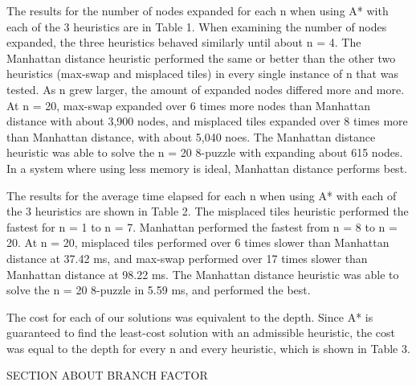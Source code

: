 \documentclass{article}
\begin{document}
		The results for the number of nodes expanded for each n when using A* with each of the 3 heuristics are in Table 1. When examining the number of nodes expanded, the three heuristics behaved similarly until about n = 4. The Manhattan distance heuristic performed the same or better than the other two heuristics (max-swap and misplaced tiles) in every single instance of n that was tested. As n grew larger, the amount of expanded nodes differed more and more. At n = 20, max-swap expanded over 6 times more nodes than Manhattan distance with about 3,900 nodes, and misplaced tiles expanded over 8 times more than Manhattan distance, with about 5,040 noes. The Manhattan distance heuristic was able to solve the n = 20 8-puzzle with expanding about 615 nodes. In a system where using less memory is ideal, Manhattan distance performs best. \par
			
	   The results for the average time elapsed for each n when using A* with each of the 3 heuristics are shown in Table 2. The misplaced tiles heuristic performed the fastest for n = 1 to n = 7. Manhattan performed the fastest from n = 8 to n = 20. At n = 20, misplaced tiles performed over 6 times slower than Manhattan distance at 37.42 ms, and max-swap performed over 17 times slower than Manhattan distance at 98.22 ms. The Manhattan distance heuristic was able to solve the n = 20 8-puzzle in 5.59 ms, and performed the best. \par
	   
	   The cost for each of our solutions was equivalent to the depth. Since A* is guaranteed to find the least-cost solution with an admissible heuristic, the cost was equal to the depth for every n and every heuristic, which is shown in Table 3. \par
	   
	   SECTION ABOUT BRANCH FACTOR \par
\end{document}
